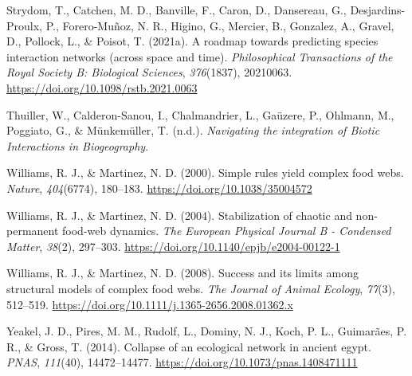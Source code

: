 \documentclass[
]{article}
\newlength{\cslhangindent}
\newenvironment{CSLReferences}[2] %
 {\begin{list}{}{%
  \setlength{\itemindent}{0pt}
  \setlength{\leftmargin}{0pt}
  \setlength{\parsep}{0pt}
  \ifodd #1
   \setlength{\leftmargin}{\cslhangindent}
   \setlength{\itemindent}{-1\cslhangindent}
  \fi
  \setlength{\itemsep}{#2\baselineskip}}}
 {\end{list}}
\begin{document}
\begin{CSLReferences}{1}{0}
Strydom, T., Catchen, M. D., Banville, F., Caron, D., Dansereau, G.,
Desjardins-Proulx, P., Forero-Muñoz, N. R., Higino, G., Mercier, B.,
Gonzalez, A., Gravel, D., Pollock, L., \& Poisot, T. (2021a). A roadmap
towards predicting species interaction networks (across space and time).
\emph{Philosophical Transactions of the Royal Society B: Biological
Sciences}, \emph{376}(1837), 20210063.
\url{https://doi.org/10.1098/rstb.2021.0063}

Thuiller, W., Calderon-Sanou, I., Chalmandrier, L., Gaüzere, P.,
Ohlmann, M., Poggiato, G., \& Münkemüller, T. (n.d.). \emph{Navigating
the integration of Biotic Interactions in Biogeography}.

Williams, R. J., \& Martinez, N. D. (2000). Simple rules yield complex
food webs. \emph{Nature}, \emph{404}(6774), 180--183.
\url{https://doi.org/10.1038/35004572}

Williams, R. J., \& Martinez, N. D. (2004). Stabilization of chaotic and
non-permanent food-web dynamics. \emph{The European Physical Journal B -
Condensed Matter}, \emph{38}(2), 297--303.
\url{https://doi.org/10.1140/epjb/e2004-00122-1}

Williams, R. J., \& Martinez, N. D. (2008). Success and its limits among
structural models of complex food webs. \emph{The Journal of Animal
Ecology}, \emph{77}(3), 512--519.
\url{https://doi.org/10.1111/j.1365-2656.2008.01362.x}

Yeakel, J. D., Pires, M. M., Rudolf, L., Dominy, N. J., Koch, P. L.,
Guimarães, P. R., \& Gross, T. (2014). Collapse of an ecological network
in ancient egypt. \emph{PNAS}, \emph{111}(40), 14472--14477.
\url{https://doi.org/10.1073/pnas.1408471111}

\end{CSLReferences}
\end{document}
